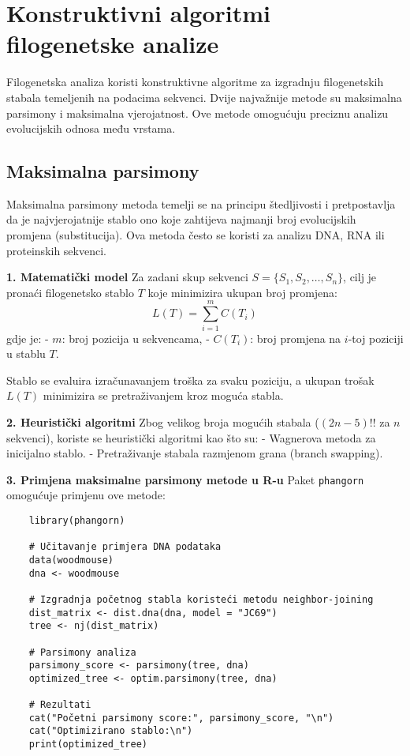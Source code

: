 \documentclass[10pt,a4paper,twoside]{article}
\begin{document}
\section*{Konstruktivni algoritmi filogenetske analize}

Filogenetska analiza koristi konstruktivne algoritme za izgradnju filogenetskih stabala temeljenih na podacima sekvenci. Dvije najvažnije metode su maksimalna parsimony i maksimalna vjerojatnost. Ove metode omogućuju preciznu analizu evolucijskih odnosa među vrstama.

\subsection*{Maksimalna parsimony}

Maksimalna parsimony metoda temelji se na principu štedljivosti i pretpostavlja da je najvjerojatnije stablo ono koje zahtijeva najmanji broj evolucijskih promjena (substitucija). Ova metoda često se koristi za analizu DNA, RNA ili proteinskih sekvenci.

\textbf{1. Matematički model}  
Za zadani skup sekvenci \( S = \{S_1, S_2, \ldots, S_n\} \), cilj je pronaći filogenetsko stablo \( T \) koje minimizira ukupan broj promjena:
\[
L(T) = \sum_{i=1}^m C(T_i)
\]
gdje je:
- \( m \): broj pozicija u sekvencama,
- \( C(T_i) \): broj promjena na \( i \)-toj poziciji u stablu \( T \).

Stablo se evaluira izračunavanjem troška za svaku poziciju, a ukupan trošak \( L(T) \) minimizira se pretraživanjem kroz moguća stabla.

\textbf{2. Heuristički algoritmi}  
Zbog velikog broja mogućih stabala (\( (2n-5)!! \) za \( n \) sekvenci), koriste se heuristički algoritmi kao što su:
- Wagnerova metoda za inicijalno stablo.
- Pretraživanje stabala razmjenom grana (branch swapping).

\textbf{3. Primjena maksimalne parsimony metode u R-u}  
Paket \texttt{phangorn} omogućuje primjenu ove metode:
\begin{verbatim}
	library(phangorn)
	
	# Učitavanje primjera DNA podataka
	data(woodmouse)
	dna <- woodmouse
	
	# Izgradnja početnog stabla koristeći metodu neighbor-joining
	dist_matrix <- dist.dna(dna, model = "JC69")
	tree <- nj(dist_matrix)
	
	# Parsimony analiza
	parsimony_score <- parsimony(tree, dna)
	optimized_tree <- optim.parsimony(tree, dna)
	
	# Rezultati
	cat("Početni parsimony score:", parsimony_score, "\n")
	cat("Optimizirano stablo:\n")
	print(optimized_tree)
\end{verbatim}
\end{document}

